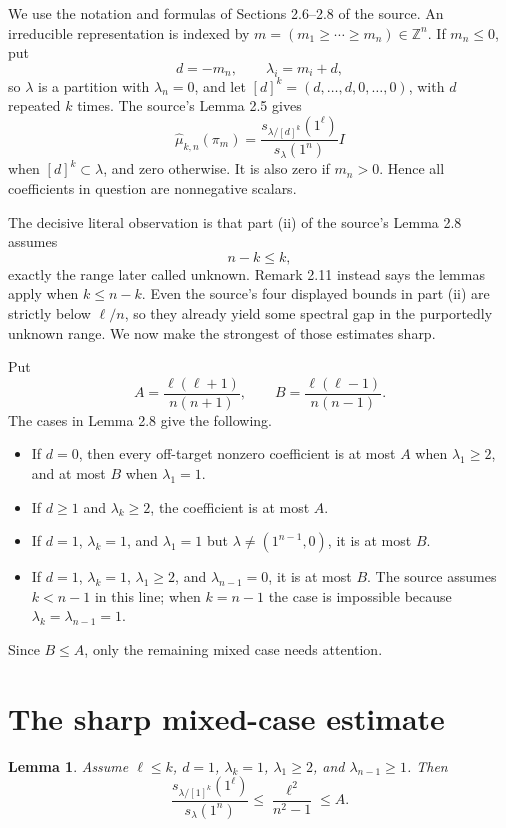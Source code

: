 \documentclass[11pt]{article}
\newtheorem{lemma}{Lemma}
\begin{document}
We use the notation and formulas of Sections 2.6--2.8 of the source.  An
irreducible representation is indexed by
$m=(m_1\geq\cdots\geq m_n)\in\mathbb Z^n$.  If $m_n\leq0$, put
\[
 d=-m_n,\qquad \lambda_i=m_i+d,
\]
so $\lambda$ is a partition with $\lambda_n=0$, and let
$[d]^k=(d,\ldots,d,0,\ldots,0)$, with $d$ repeated $k$ times.  The source's
Lemma 2.5 gives
\begin{equation}\label{eq:source-fourier}
 \widehat\mu_{k,n}(\pi_m)
 =\frac{s_{\lambda/[d]^k}(1^\ell)}{s_\lambda(1^n)}I
\end{equation}
when $[d]^k\subset\lambda$, and zero otherwise.  It is also zero if
$m_n>0$.  Hence all coefficients in question are nonnegative scalars.

The decisive literal observation is that part (ii) of the source's Lemma 2.8
assumes
\[
 n-k\leq k,
\]
exactly the range later called unknown.  Remark 2.11 instead says the lemmas
apply when $k\leq n-k$.  Even the source's four displayed bounds in part
(ii) are strictly below $\ell/n$, so they already yield some spectral gap in
the purportedly unknown range.  We now make the strongest of those estimates
sharp.

Put
\[
 A=\frac{\ell(\ell+1)}{n(n+1)},\qquad
 B=\frac{\ell(\ell-1)}{n(n-1)}.
\]
The cases in Lemma 2.8 give the following.
\begin{itemize}
\item If $d=0$, then every off-target nonzero coefficient is at most $A$
  when $\lambda_1\geq2$, and at most $B$ when $\lambda_1=1$.
\item If $d\geq1$ and $\lambda_k\geq2$, the coefficient is at most $A$.
\item If $d=1$, $\lambda_k=1$, and $\lambda_1=1$ but
  $\lambda\ne(1^{n-1},0)$, it is at most $B$.
\item If $d=1$, $\lambda_k=1$, $\lambda_1\geq2$, and
  $\lambda_{n-1}=0$, it is at most $B$.  The source assumes $k<n-1$ in
  this line; when $k=n-1$ the case is impossible because
  $\lambda_k=\lambda_{n-1}=1$.
\end{itemize}
Since $B\leq A$, only the remaining mixed case needs attention.

\section{The sharp mixed-case estimate}

\begin{lemma}\label{lem:mixed}
Assume $\ell\leq k$, $d=1$, $\lambda_k=1$, $\lambda_1\geq2$, and
$\lambda_{n-1}\geq1$.  Then
\[
 \frac{s_{\lambda/[1]^k}(1^\ell)}{s_\lambda(1^n)}
 \leq \frac{\ell^2}{n^2-1}\leq A.
\]
\end{lemma}
\end{document}
